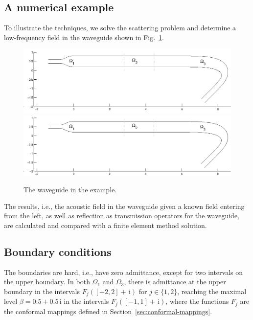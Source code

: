 \documentclass{kluwer}
\renewcommand{\i}{\,\mathrm{i}}
\begin{document}
\begin{article}
\section{A numerical example}
\label{sec:numerical-example}
To illustrate the techniques, we solve the scattering problem and
determine a low-frequency field in the waveguide shown in
Fig.~\ref{fig:exwg}.
\begin{figure}[htb]
  \centering \ifpdf
  \includegraphics[width=\textwidth]{waveguide.jpg}
  \else
  \includegraphics[width=\textwidth]{waveguide.eps}
  \fi
  \caption{The waveguide in the example.}
  \label{fig:exwg}
\end{figure}
The results, i.e., the acoustic field in the waveguide given a known
field entering from the left, as well as reflection as transmission
operators for the waveguide, are calculated and compared with a finite
element method solution.

\subsection{Boundary conditions}
\label{sec:boundary-conditions}



The boundaries are hard, i.e., have zero admittance, except for two
intervals on the upper boundary. In both $\Omega_1$ and $\Omega_3$,
there is admittance at the upper boundary in the intervals
$F_j([-2,2]+\i)$ for $j\in\{1,2\}$, reaching the maximal level
$\beta=0.5+0.5\i$ in the intervals $F_j([-1,1]+\i)$, where the
functions $F_j$ are the conformal mappings defined in
Section~\ref{sec:conformal-mappings}. 


\end{article}
\end{document}
